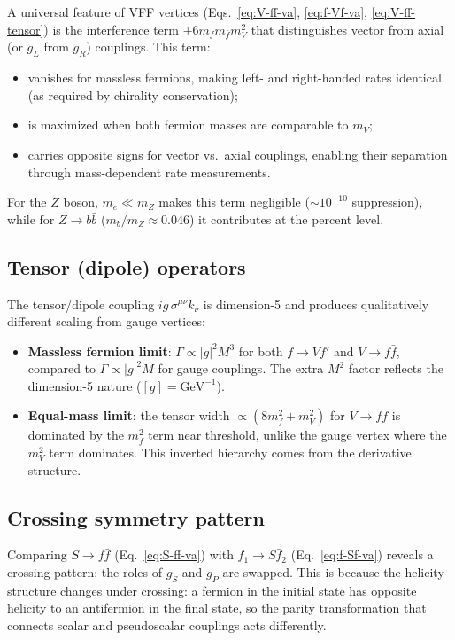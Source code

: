 \documentclass[11pt,a4paper]{article}
\begin{document}
A universal feature of VFF vertices (Eqs.~\eqref{eq:V-ff-va}, \eqref{eq:f-Vf-va},
\eqref{eq:V-ff-tensor}) is the interference term $\pm 6 m_f m_{\bar f} m_V^2$ that
distinguishes vector from axial (or $g_L$ from $g_R$) couplings. This term:
\begin{itemize}
\item vanishes for massless fermions, making left- and right-handed rates identical
  (as required by chirality conservation);
\item is maximized when both fermion masses are comparable to $m_V$;
\item carries opposite signs for vector vs.\ axial couplings, enabling their separation
  through mass-dependent rate measurements.
\end{itemize}

For the $Z$ boson, $m_e \ll m_Z$ makes this term negligible ($\sim 10^{-10}$ suppression),
while for $Z\to b\bar{b}$ ($m_b/m_Z \approx 0.046$) it contributes at the percent level.

\subsection{Tensor (dipole) operators}

The tensor/dipole coupling $ig\,\sigma^{\mu\nu}k_\nu$ is dimension-5 and produces qualitatively
different scaling from gauge vertices:

\begin{itemize}
\item \textbf{Massless fermion limit}: $\Gamma \propto |g|^2 M^3$ for both $f\to Vf'$ and
  $V\to f\bar{f}$, compared to $\Gamma \propto |g|^2 M$ for gauge couplings. The extra $M^2$
  factor reflects the dimension-5 nature ($[g] = \text{GeV}^{-1}$).

\item \textbf{Equal-mass limit}: the tensor width $\propto (8m_f^2+m_V^2)$ for $V\to f\bar{f}$
  is dominated by the $m_f^2$ term near threshold, unlike the gauge vertex where the $m_V^2$ term
  dominates. This inverted hierarchy comes from the derivative structure.
\end{itemize}

\subsection{Crossing symmetry pattern}

Comparing $S\to f\bar{f}$ (Eq.~\eqref{eq:S-ff-va}) with $f_1\to S\bar{f}_2$
(Eq.~\eqref{eq:f-Sf-va}) reveals a crossing pattern: the roles of $g_S$ and $g_P$ are
swapped. This is because the helicity structure changes under crossing: a fermion in the
initial state has opposite helicity to an antifermion in the final state, so the parity
transformation that connects scalar and pseudoscalar couplings acts differently.
\end{document}
